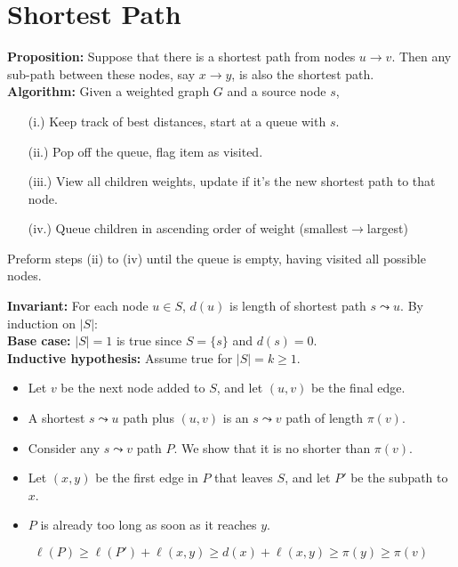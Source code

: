 \vspace{-1.5em}
\section{Shortest Path}
\label{sec:dstra}
\begin{theo}
    
    \textbf{Proposition:} Suppose that there is a shortest path from nodes $u\to v$. Then any
    sub-path between these nodes, say $x\to y$, is also the shortest path.\\

    \noindent
    \textbf{Algorithm:} Given a weighted graph $G$ and a source node $s$, 
    \begin{enumerate}
        \item [(i.)] Keep track of best distances, start at a queue with $s$.
        \item [(ii.)] Pop off the queue, flag item as visited.
        \item [(iii.)] View all children weights, update if it's the new shortest path to that node.
        \item [(iv.)] Queue children in ascending order of weight (smallest$\to$largest)
    \end{enumerate}
    Preform steps (ii) to (iv) until the queue is empty, having visited all possible nodes.
\end{theo}


\vspace{-1em}
\begin{Proof}

    \textbf{Invariant:} For each node $u \in S$, $d(u)$ is length of shortest path $s \leadsto u$. By induction on $|S|$:\\
    \textbf{Base case:} $|S| = 1$ is true since $S = \{s\}$ and $d(s) = 0$.\\
    \textbf{Inductive hypothesis:} Assume true for $|S| = k \geq 1$.
    \begin{itemize}
        \item Let $v$ be the next node added to $S$, and let $(u, v)$ be the final edge.
        \item A shortest $s \leadsto u$ path plus $(u, v)$ is an $s \leadsto v$ path of length $\pi(v)$.
        \item Consider any $s \leadsto v$ path $P$. We show that it is no shorter than $\pi(v)$.
        \item Let $(x, y)$ be the first edge in $P$ that leaves $S$, and let $P'$ be the subpath to $x$.
        \item $P$ is already too long as soon as it reaches $y$.
    \end{itemize}
    \[
    \ell(P) \geq \ell(P') + \ell(x, y) \geq d(x) + \ell(x, y) \geq \pi(y) \geq \pi(v)
    \]
    \end{Proof}
    
